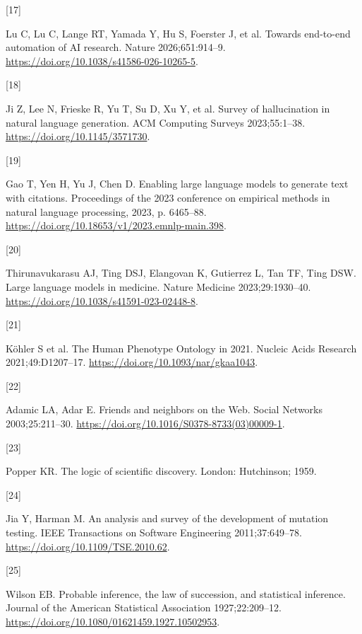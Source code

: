 \documentclass[
]{article}
\newlength{\cslhangindent}
\newlength{\csllabelwidth}
\newlength{\cslentryspacingunit} %
\newenvironment{CSLReferences}[2] %
 {%
  \setlength{\parindent}{0pt}
  \ifodd #1
  \let\oldpar\par
  \def\par{\hangindent=\cslhangindent\oldpar}
  \fi
  \setlength{\parskip}{#2\cslentryspacingunit}
 }%
 {}
\newcommand{\CSLLeftMargin}[1]{\parbox[t]{\csllabelwidth}{#1}}
\newcommand{\CSLRightInline}[1]{\parbox[t]{\linewidth - \csllabelwidth}{#1}\break}
\begin{document}
\begin{CSLReferences}{0}{0}
\leavevmode{}%
\CSLLeftMargin{{[}17{]} }%
\CSLRightInline{Lu C, Lu C, Lange RT, Yamada Y, Hu S, Foerster J, et al.
Towards end-to-end automation of {AI} research. Nature 2026;651:914--9.
\url{https://doi.org/10.1038/s41586-026-10265-5}.}

\leavevmode{}%
\CSLLeftMargin{{[}18{]} }%
\CSLRightInline{Ji Z, Lee N, Frieske R, Yu T, Su D, Xu Y, et al. Survey
of hallucination in natural language generation. ACM Computing Surveys
2023;55:1--38. \url{https://doi.org/10.1145/3571730}.}

\leavevmode{}%
\CSLLeftMargin{{[}19{]} }%
\CSLRightInline{Gao T, Yen H, Yu J, Chen D. Enabling large language
models to generate text with citations. Proceedings of the 2023
conference on empirical methods in natural language processing, 2023, p.
6465--88. \url{https://doi.org/10.18653/v1/2023.emnlp-main.398}.}

\leavevmode{}%
\CSLLeftMargin{{[}20{]} }%
\CSLRightInline{Thirunavukarasu AJ, Ting DSJ, Elangovan K, Gutierrez L,
Tan TF, Ting DSW. Large language models in medicine. Nature Medicine
2023;29:1930--40. \url{https://doi.org/10.1038/s41591-023-02448-8}.}

\leavevmode{}%
\CSLLeftMargin{{[}21{]} }%
\CSLRightInline{Köhler S et al. The {Human Phenotype Ontology} in 2021.
Nucleic Acids Research 2021;49:D1207--17.
\url{https://doi.org/10.1093/nar/gkaa1043}.}

\leavevmode{}%
\CSLLeftMargin{{[}22{]} }%
\CSLRightInline{Adamic LA, Adar E. Friends and neighbors on the {Web}.
Social Networks 2003;25:211--30.
\url{https://doi.org/10.1016/S0378-8733(03)00009-1}.}

\leavevmode{}%
\CSLLeftMargin{{[}23{]} }%
\CSLRightInline{Popper KR. The logic of scientific discovery. London:
Hutchinson; 1959.}

\leavevmode{}%
\CSLLeftMargin{{[}24{]} }%
\CSLRightInline{Jia Y, Harman M. An analysis and survey of the
development of mutation testing. IEEE Transactions on Software
Engineering 2011;37:649--78. \url{https://doi.org/10.1109/TSE.2010.62}.}

\leavevmode{}%
\CSLLeftMargin{{[}25{]} }%
\CSLRightInline{Wilson EB. Probable inference, the law of succession,
and statistical inference. Journal of the American Statistical
Association 1927;22:209--12.
\url{https://doi.org/10.1080/01621459.1927.10502953}.}


\end{CSLReferences}
\end{document}
